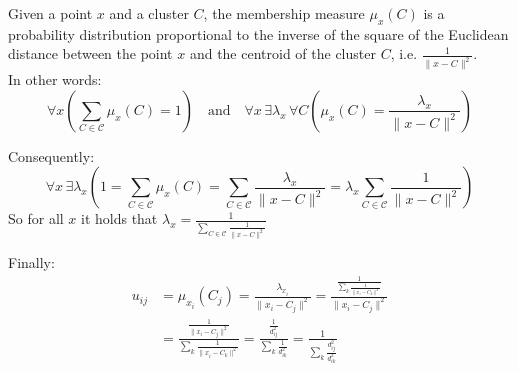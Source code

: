 \begin{definition}\label{def:fuzzy}
	\begin{modified}
	Given a point $x$ and a cluster $C$, the membership measure $\mu_x(C)$ is a probability distribution proportional to the inverse of the square of the Euclidean distance between the point $x$ and the centroid of the cluster $C$, i.e. $\frac{1}{\|x-C\|^2}$.\\ In other words:
	$$\forall x \left( \sum_{C\in\mathcal{C}}\mu_x(C)=1 \right) \quad \text{and} \quad \forall x \, \exists \lambda_x \, \forall C \left(\mu_x(C)=\frac{\lambda_x}{\|x-C\|^2}\right)$$

		\bigskip\noindent Consequently:
		\[
			\forall x \, \exists \lambda_x \left( 1 = \sum_{C\in\mathcal{C}}\mu_x(C) = \sum_{C\in\mathcal{C}}\frac{\lambda_x}{\|x-C\|^2} = \lambda_x\sum_{C\in\mathcal{C}}\frac{1}{\|x-C\|^2}\right)
		\]
		So for all $x$ it holds that $\lambda_x = \frac{1}{\sum_{C\in\mathcal{C}}\frac{1}{\|x-C\|^2}}$

		\bigskip\noindent Finally:
		\begin{align*}
			u_{ij} &= \mu_{x_i}(C_j) = \frac{\lambda_{x_i}}{\|x_i-C_j\|^2} = \frac{\frac{1}{\sum_{k}\frac{1}{\|x_i-C_k\|^2}}}{\|x_i-C_j\|^2} \\
			&= \frac{\frac{1}{\|x_i-C_j\|^2}}{\sum_{k}\frac{1}{\|x_i-C_k\|^2}} = \frac{\frac{1}{d_{ij}^2}}{\sum_{k}\frac{1}{d_{ik}^2}} = \frac{1}{\sum_{k}\frac{d_{ij}^2}{d_{ik}^2}}
		\end{align*}
	\end{modified}
\end{definition}

